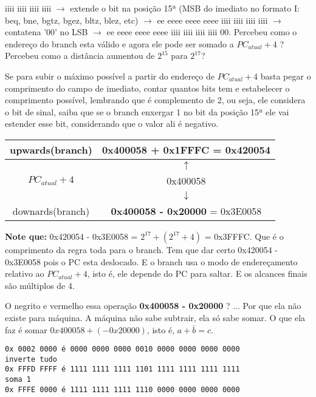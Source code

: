 \documentclass{article}
\begin{document}
iiii iiii iiii iiii $\rightarrow$ extende o bit na posição 15ª (MSB do imediato
no formato I: beq, bne, bgtz, bgez, bltz, blez, etc) $\rightarrow$ ee eeee eeee
eeee iiii iiii iiii iiii $\rightarrow$ contatena '00' no LSB $\rightarrow$ ee
eeee eeee eeee iiii iiii iiii iiii 00. Percebeu como o endereço do branch esta
válido e agora ele pode ser somado a $PC_{atual} + 4$ ? Percebeu como a
distância aumentou de $2^{15}$ para $2^{17}$?

Se para subir o máximo possível a partir do endereço de $PC_{atual} + 4$ basta 
pegar o comprimento do campo de imediato, contar quantos bits tem e estabelecer
o comprimento possível, lembrando que é complemento de 2, ou seja, ele considera
o bit de sinal, saiba que se o branch enxergar 1 no bit da posição 15ª ele vai 
estender esse bit, considerando que o valor ali é negativo.

\begin{table}[ht!]
\begin{tabular}{|c|c|}
\hline upwards(branch) & 0x400058 + 0x1FFFC = 0x420054 \\ 
\hline  & $\uparrow$ \\
\hline $PC_{atual} + 4$ & 0x400058 \\
\hline  & $\downarrow$ \\
\hline downards(branch) & \textbf{\color{Red} 0x400058 - 0x20000} = 0x3E0058 \\ 
\hline
\end{tabular}
\end{table}

\textbf{Note que:} 0x420054 - 0x3E0058 = $2^{17} + (2^{17} + 4)$ = 0x3FFFC. Que
é o comprimento da regra toda para o branch. Tem que dar certo  0x420054 -
0x3E0058 pois o PC esta deslocado. E o branch usa o modo de endereçamento
relativo ao $PC_{atual} + 4$, isto é, ele depende do PC para saltar. E os
alcances finais são múltiplos de 4.

O negrito e vermelho essa operação \textbf{\color{Red} 0x400058 - 0x20000} ? ...
Por que ela não existe para máquina. A máquina não sabe subtrair, ela só sabe
somar. O que ela faz é somar $0x400058 + (-0x20000)$, isto é, $a + 
\bar{b} = 
c$.

\begin{verbatim}
0x 0002 0000 é 0000 0000 0000 0010 0000 0000 0000 0000
inverte tudo
0x FFFD FFFF é 1111 1111 1111 1101 1111 1111 1111 1111
soma 1
0x FFFE 0000 é 1111 1111 1111 1110 0000 0000 0000 0000
\end{verbatim}
\end{document}
